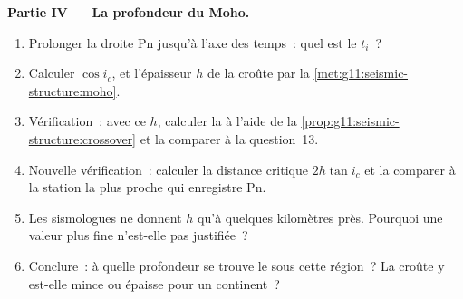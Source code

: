 \begin{problem}
\medskip
\noindent\textbf{Partie IV --- La profondeur du Moho.}
\begin{enumerate}[resume]
  \item Prolonger la droite Pn jusqu'à l'axe des temps~: quel est le  $t_i$~?
  \item Calculer $\cos i_c$, et l'épaisseur $h$ de la croûte par la
        \cref{met:g11:seismic-structure:moho}.
  \item Vérification~: avec ce $h$, calculer la  à
        l'aide de la \cref{prop:g11:seismic-structure:crossover} et la
        comparer à la question~13.
  \item Nouvelle vérification~: calculer la distance critique
        $2h\tan i_c$ et la comparer à la station la plus proche qui
        enregistre Pn.
  \item Les sismologues ne donnent $h$ qu'à quelques kilomètres près.
        Pourquoi une valeur plus fine n'est-elle pas justifiée~?
  \item Conclure~: à quelle profondeur se trouve le  sous cette
        région~? La croûte y est-elle mince ou épaisse pour un continent~?
\end{enumerate}
\end{problem}

